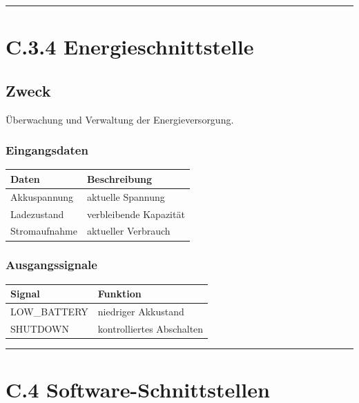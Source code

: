 \documentclass[
  a4paper,
  12pt,
  DIV=12,        %
  parskip=half,  %
  headings=small %
]{scrartcl}
\theoremstyle{definition}
\theoremstyle{definition}
\begin{document}
\begin{center}\rule{0.5\linewidth}{0.5pt}\end{center}

\section{C.3.4 Energieschnittstelle}\label{c.3.4-energieschnittstelle}

\subsection{Zweck}\label{zweck-5}

Überwachung und Verwaltung der Energieversorgung.

\subsubsection{Eingangsdaten}\label{eingangsdaten}

\begin{longtable}[]{@{}ll@{}}
\toprule\noalign{}
Daten & Beschreibung \\
\midrule\noalign{}
\endhead
\bottomrule\noalign{}
\endlastfoot
Akkuspannung & aktuelle Spannung \\
Ladezustand & verbleibende Kapazität \\
Stromaufnahme & aktueller Verbrauch \\
\end{longtable}

\subsubsection{Ausgangssignale}\label{ausgangssignale}

\begin{longtable}[]{@{}ll@{}}
\toprule\noalign{}
Signal & Funktion \\
\midrule\noalign{}
\endhead
\bottomrule\noalign{}
\endlastfoot
LOW\_BATTERY & niedriger Akkustand \\
SHUTDOWN & kontrolliertes Abschalten \\
\end{longtable}

\begin{center}\rule{0.5\linewidth}{0.5pt}\end{center}

\section{C.4 Software-Schnittstellen}\label{c.4-software-schnittstellen}
\end{document}
